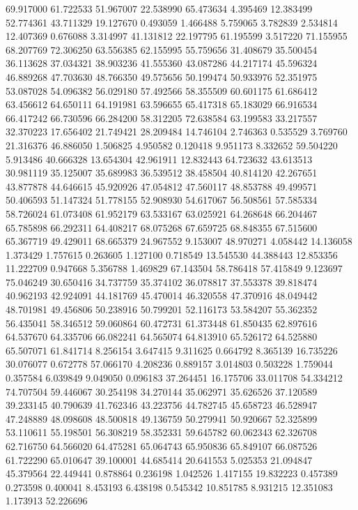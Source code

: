 69.917000
61.722533
51.967007
22.538990
65.473634
4.395469
12.383499
52.774361
43.711329
19.127670
0.493059
1.466488
5.759065
3.782839
2.534814
12.407369
0.676088
3.314997
41.131812
22.197795
61.195599
3.517220
71.155955
68.207769
72.306250
63.556385
62.155995
55.759656
31.408679
35.500454
36.113628
37.034321
38.903236
41.555360
43.087286
44.217174
45.596324
46.889268
47.703630
48.766350
49.575656
50.199474
50.933976
52.351975
53.087028
54.096382
56.029180
57.492566
58.355509
60.601175
61.686412
63.456612
64.650111
64.191981
63.596655
65.417318
65.183029
66.916534
66.417242
66.730596
66.284200
58.312205
72.638584
63.199583
33.217557
32.370223
17.656402
21.749421
28.209484
14.746104
2.746363
0.535529
3.769760
21.316376
46.886050
1.506825
4.950582
0.120418
9.951173
8.332652
59.504220
5.913486
40.666328
13.654304
42.961911
12.832443
64.723632
43.613513
30.981119
35.125007
35.689983
36.539512
38.458504
40.814120
42.267651
43.877878
44.646615
45.920926
47.054812
47.560117
48.853788
49.499571
50.406593
51.147324
51.778155
52.908930
54.617067
56.508561
57.585334
58.726024
61.073408
61.952179
63.533167
63.025921
64.268648
66.204467
65.785898
66.292311
64.408217
68.075268
67.659725
68.848355
67.515600
65.367719
49.429011
68.665379
24.967552
9.153007
48.970271
4.058442
14.136058
1.373429
1.757615
0.263605
1.127100
0.718549
13.545530
44.388443
12.853356
11.222709
0.947668
5.356788
1.469829
67.143504
58.786418
57.415849
9.123697
75.046249
30.650416
34.737759
35.374102
36.078817
37.553378
39.818474
40.962193
42.924091
44.181769
45.470014
46.320558
47.370916
48.049442
48.701981
49.456806
50.238916
50.799201
52.116173
53.584207
55.362352
56.435041
58.346512
59.060864
60.472731
61.373448
61.850435
62.897616
64.537670
64.335706
66.082241
64.565074
64.813910
65.526172
64.525880
65.507071
61.841714
8.256154
3.647415
9.311625
0.664792
8.365139
16.735226
30.076077
0.672778
57.066170
4.208236
0.889157
3.014803
0.503228
1.759044
0.357584
6.039849
9.049050
0.096183
37.264451
16.175706
33.011708
54.334212
74.707504
59.446067
30.254198
34.270144
35.062971
35.626526
37.120589
39.233145
40.790639
41.762346
43.223756
44.782745
45.658723
46.528947
47.248889
48.098608
48.500818
49.136759
50.279941
50.920667
52.325899
53.110611
55.198501
56.308219
58.352331
59.645782
60.062343
62.326708
62.716750
64.566020
64.475281
65.064743
65.950836
65.849107
66.087526
61.722290
65.010647
39.100001
44.685414
20.641553
5.025353
21.094847
45.379564
22.449441
0.878864
0.236198
1.042526
1.417155
19.832223
0.457389
0.273598
0.400041
8.453193
6.438198
0.545342
10.851785
8.931215
12.351083
1.173913
52.226696

